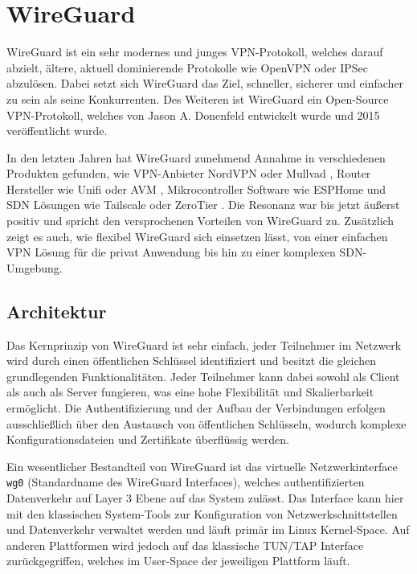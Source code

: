 \section{WireGuard} \label{wireguard}

WireGuard ist ein sehr modernes und junges VPN-Protokoll, welches darauf abzielt, ältere, aktuell dominierende Protokolle wie OpenVPN oder IPSec abzulösen. Dabei setzt sich WireGuard das Ziel, schneller, sicherer und einfacher zu sein als seine Konkurrenten. Des Weiteren ist WireGuard ein Open-Source \gls{VPN}-Protokoll, welches von Jason A. Donenfeld entwickelt wurde und 2015 veröffentlicht wurde. \cite{Wireguard_Whitepaper, Wireguard_Presentations}

In den letzten Jahren hat WireGuard zunehmend Annahme in verschiedenen Produkten gefunden, wie VPN-Anbieter NordVPN \cite{NordLynx} oder Mullvad \cite{Mullvad_Wireguard}, Router Hersteller wie Unifi \cite{Unifi_Wireguard} oder AVM \cite{AVM_Wireguard}, Mikrocontroller Software wie ESPHome \cite{ESPHome_Wireguard} und \acrfull{SDN} Lösungen wie Tailscale \cite{Tailscale} oder ZeroTier \cite{ZeroTier}. Die Resonanz war bis jetzt äußerst positiv und spricht den versprochenen Vorteilen von WireGuard zu. Zusätzlich zeigt es auch, wie flexibel WireGuard sich einsetzen lässt, von einer einfachen VPN Lösung für die privat Anwendung bis hin zu einer komplexen \gls{SDN}-Umgebung.

\subsection{Architektur}

Das Kernprinzip von WireGuard ist sehr einfach, jeder Teilnehmer im Netzwerk wird durch einen öffentlichen Schlüssel identifiziert und besitzt die gleichen grundlegenden Funktionalitäten. Jeder Teilnehmer kann dabei sowohl als Client als auch als Server fungieren, was eine hohe Flexibilität und Skalierbarkeit ermöglicht. Die Authentifizierung und der Aufbau der Verbindungen erfolgen ausschließlich über den Austausch von öffentlichen Schlüsseln, wodurch komplexe Konfigurationsdateien und Zertifikate überflüssig werden.

Ein wesentlicher Bestandteil von WireGuard ist das virtuelle Netzwerkinterface \texttt{wg0} (Standardname des WireGuard Interfaces), welches authentifizierten Datenverkehr auf Layer 3 Ebene auf das System zulässt. Das Interface kann hier mit den klassischen System-Tools zur Konfiguration von Netzwerkschnittstellen und Datenverkehr verwaltet werden und läuft primär im Linux Kernel-Space. Auf anderen Plattformen wird jedoch auf das klassische TUN/TAP Interface zurückgegriffen, welches im User-Space der jeweiligen Plattform läuft. \cite{Wireguard_Whitepaper, Wireguard_cross_platform}

